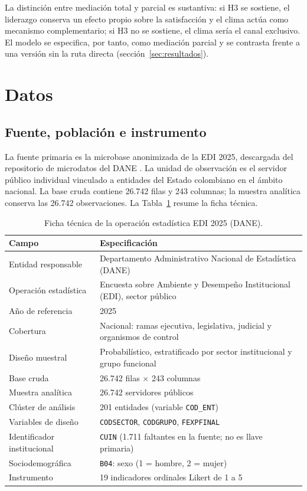 \documentclass[11pt,a4paper]{article}
\begin{document}
La distinción entre mediación total y parcial es sustantiva: si H3 se sostiene, el
liderazgo conserva un efecto propio sobre la satisfacción y el clima actúa como mecanismo
complementario; si H3 no se sostiene, el clima sería el canal exclusivo. El modelo se
especifica, por tanto, como mediación parcial y se contrasta frente a una versión sin la
ruta directa (sección~\ref{sec:resultados}).

\section{Datos}\label{sec:datos}

\subsection{Fuente, población e instrumento}

La fuente primaria es la microbase anonimizada de la EDI 2025, descargada del repositorio
de microdatos del DANE \citep{dane2025}. La unidad de observación es el servidor público
individual vinculado a entidades del Estado colombiano en el ámbito nacional. La base cruda
contiene 26.742 filas y 243 columnas; la muestra analítica conserva las 26.742
observaciones. La Tabla~\ref{tab:ficha} resume la ficha técnica.

\begin{table}[htbp]
\centering
\caption{Ficha técnica de la operación estadística EDI 2025 (DANE).}
\label{tab:ficha}
\small
\begin{tabularx}{\textwidth}{@{}lX@{}}
\toprule
Campo & Especificación \\
\midrule
Entidad responsable & Departamento Administrativo Nacional de Estadística (DANE) \\
Operación estadística & Encuesta sobre Ambiente y Desempeño Institucional (EDI), sector público \\
Año de referencia & 2025 \\
Cobertura & Nacional: ramas ejecutiva, legislativa, judicial y organismos de control \\
Diseño muestral & Probabilístico, estratificado por sector institucional y grupo funcional \\
Base cruda & 26.742 filas $\times$ 243 columnas \\
Muestra analítica & 26.742 servidores públicos \\
Clúster de análisis & 201 entidades (variable \texttt{COD\_ENT}) \\
Variables de diseño & \texttt{CODSECTOR}, \texttt{CODGRUPO}, \texttt{FEXPFINAL} \\
Identificador institucional & \texttt{CUIN} (1.711 faltantes en la fuente; no es llave primaria) \\
Sociodemográfica & \texttt{B04}: sexo (1 = hombre, 2 = mujer) \\
Instrumento & 19 indicadores ordinales Likert de 1 a 5 \\
\bottomrule
\end{tabularx}
\end{table}
\end{document}
